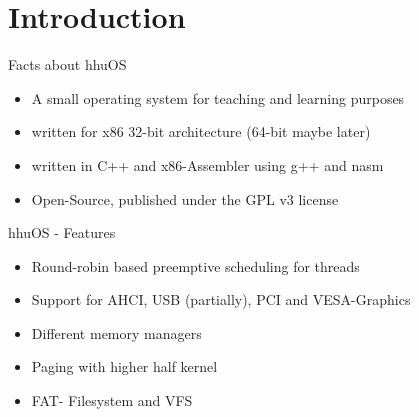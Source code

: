 \section{Introduction}
	
	\begin{frame}{Facts about hhuOS}
	\begin{itemize}
		\item A small operating system for teaching and learning purposes
		\item written for x86 32-bit architecture (64-bit maybe later)
		\item written in C++ and x86-Assembler using g++ and nasm
		\item Open-Source, published under the GPL v3 license
	\end{itemize}
	\end{frame}
	
	\begin{frame}{hhuOS - Features}
		\begin{itemize}
			\item Round-robin based preemptive scheduling for threads
			\item Support for AHCI, USB (partially), PCI and VESA-Graphics
			\item Different memory managers
			\item Paging with higher half kernel
			\item FAT- Filesystem and VFS
		\end{itemize}
	\end{frame}